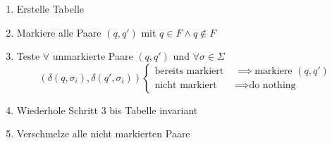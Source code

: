 \documentclass[a4paper,parskip=half,footsepline=on,headings=normal,titlepage=false]{scrartcl}
\begin{document}
\begin{enumerate}
	\item Erstelle Tabelle
	\item Markiere alle Paare $(q, q')$ mit $q\in F \wedge q\notin F$
	\item Teste $\forall$ unmarkierte Paare $(q, q')$ und $\forall \sigma \in \Sigma$
		\[
			(\delta(q,\sigma_i), \delta(q',\sigma_i))
			\begin{cases} 
				\text{bereits markiert } & \implies \text{markiere } (q, q') \\
				\text{nicht markiert } & \implies \text{do nothing}
			\end{cases}
		\]
	\item Wiederhole Schritt 3 bis Tabelle invariant
	\item Verschmelze alle nicht markierten Paare
\end{enumerate}
\end{document}
